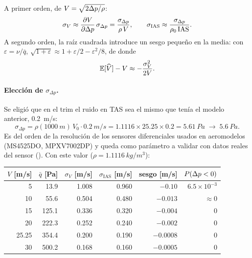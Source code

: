 \documentclass[11pt,a4paper]{article}
\begin{document}
A primer orden, de $V = \sqrt{2\Delta p/\rho}$:
\begin{equation}
  \sigma_V \approx \frac{\partial V}{\partial \Delta p}\,\sigma_{\Delta p}
           = \frac{\sigma_{\Delta p}}{\rho\,V},
  \qquad
  \sigma_{\text{IAS}} \approx \frac{\sigma_{\Delta p}}{\rho_0\,\text{IAS}} .
  \label{eq:sigmaV}
\end{equation}
A segundo orden, la raíz cuadrada introduce un sesgo pequeño en la media:
con $\varepsilon = \nu/\bar q$, $\sqrt{1+\varepsilon} \approx 1 +
\varepsilon/2 - \varepsilon^2/8$, de donde
\begin{equation}
  \mathbb{E}[\widehat V] - V \approx -\frac{\sigma_V^2}{2V}.
\end{equation}

\paragraph{Elección de $\sigma_{\Delta p}$.} Se eligió que en el trim el ruido
en TAS sea el mismo que tenía el modelo anterior, \SI{0.2}{m/s}:
\begin{equation}
  \sigma_{\Delta p} = \rho(\SI{1000}{m})\,V_0 \cdot \SI{0.2}{m/s}
  = 1.1116 \times 25.25 \times 0.2 = \SI{5.61}{Pa}
  \;\rightarrow\; \SI{5.6}{Pa}.
\end{equation}
Es del orden de la resolución de los sensores diferenciales usados en
aeromodelos (MS4525DO, MPXV7002DP) y queda como parámetro a validar con datos
reales del sensor (). Con este valor
($\rho = \SI{1.1116}{kg/m^3}$):

\begin{center}
\begin{tabular}{rrrrrr}
\toprule
$V$ [\si{m/s}] & $\bar q$ [\si{Pa}] & $\sigma_V$ [\si{m/s}] &
$\sigma_{\text{IAS}}$ [\si{m/s}] & sesgo [\si{m/s}] & $P(\Delta p<0)$ \\
\midrule
5     & 13.9  & 1.008 & 0.960 & $-0.10$   & $6.5\times10^{-3}$ \\
10    & 55.6  & 0.504 & 0.480 & $-0.013$  & $\approx 0$ \\
15    & 125.1 & 0.336 & 0.320 & $-0.004$  & 0 \\
20    & 222.3 & 0.252 & 0.240 & $-0.002$  & 0 \\
25.25 & 354.4 & 0.200 & 0.190 & $-0.0008$ & 0 \\
30    & 500.2 & 0.168 & 0.160 & $-0.0005$ & 0 \\
\bottomrule
\end{tabular}
\end{center}
\end{document}
